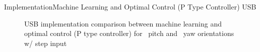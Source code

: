 \documentclass{beamer}
\begin{document}
\begin{frame}{Implementation}{Machine Learning and Optimal Control (P Type Controller) USB}
    \begin{figure}
      \centering
      \caption{USB implementation comparison between machine learning and optimal control (P type controller) for ~pitch and ~yaw orientations w/ step input}
      \label{fig:LQRvADP_USB}
    \end{figure}
\end{frame}
\end{document}
